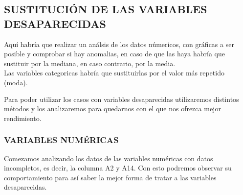 \documentclass[11pt]{article}
\begin{document}
    \subsection{SUSTITUCIÓN DE LAS VARIABLES
DESAPARECIDAS}\label{sustituciuxf3n-de-las-variables-desaparecidas}

    Aquí habría que realizar un análsis de los datos númericos, con gráficas
a ser posible y comprobar si hay anomalias, en caso de que las haya
habría que sustituir por la mediana, en caso contrario, por la media.\\
Las variables categoricas habría que sustituirlas por el valor más
repetido (moda).

    Para poder utilizar los casos con variables desaparecidas utilizaremos
distintos métodos y los analizaremos para quedarnos con el que nos
ofrezca mejor rendimiento.

    \subsubsection{VARIABLES NUMÉRICAS}\label{variables-numuxe9ricas}

    Comezamos analizando los datos de las variables numéricas con datos
incompletos, es decir, la columna A2 y A14. Con esto podremos observar
su comportamiento para así saber la mejor forma de tratar a las
variables desaparecidas.
\end{document}
